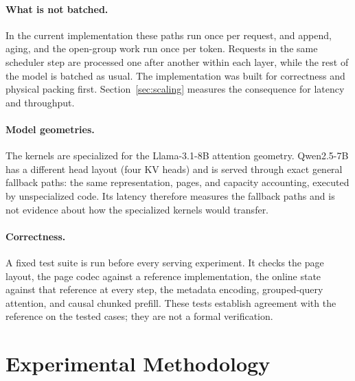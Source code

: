 \documentclass{article}
\begin{document}
\paragraph{What is not batched.}
In the current implementation these paths run once per request, and append, aging, and the open-group
work run once per token. Requests in the same scheduler step are processed one after another within
each layer, while the rest of the model is batched as usual. The implementation was built for
correctness and physical packing first. Section~\ref{sec:scaling} measures the consequence for latency and throughput.

\paragraph{Model geometries.}
The kernels are specialized for the Llama-3.1-8B attention geometry. Qwen2.5-7B has a different head
layout (four KV heads) and is served through exact general fallback paths: the same representation, pages, and capacity
accounting, executed by unspecialized code. Its latency therefore measures the fallback paths and is
not evidence about how the specialized kernels would transfer.

\paragraph{Correctness.}
A fixed test suite is run before every serving experiment. It checks the page layout, the page codec
against a reference implementation, the online state against that reference at every step, the
metadata encoding, grouped-query attention, and causal chunked prefill. These tests establish agreement
with the reference on the tested cases; they are not a formal verification.

\section{Experimental Methodology}
\label{sec:method}

\end{document}
